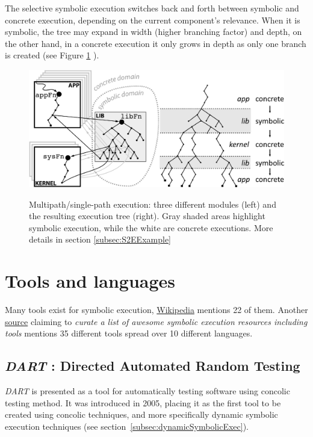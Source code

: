 \documentclass[11pt]{IEEEtran}
\begin{document}
    		The selective symbolic execution switches back and forth between symbolic and concrete execution, depending on the current component's relevance. When it is symbolic, the tree may expand in width (higher branching factor) and depth, on the other hand, in a concrete execution it only grows in depth as only one branch is created (see Figure \ref{fig:selectiveSymbolicExample} ).
    		\begin{figure}
    			\centering
    			\includegraphics[scale=0.9]{selectiveSymbolicExecExample.png}
    			\label{fig:selectiveSymbolicExample}
    			\caption{Multipath/single-path execution: three different modules (left) and the resulting execution tree (right). Gray shaded areas highlight symbolic execution, while the white are concrete executions. More details in section \ref{subsec:S2EExample}}
    		\end{figure}

  \section{Tools and languages}
  	Many tools exist for symbolic execution, \href{https://en.wikipedia.org/wiki/Symbolic_execution\#Tools}{Wikipedia} mentions 22 of them. Another \href{https://github.com/ksluckow/awesome-symbolic-execution\#tools}{source} claiming to \emph{curate a list of awesome symbolic execution resources including tools} mentions 35 different tools spread over 10 different languages.\\

    \subsection{\emph{DART} : Directed Automated Random Testing}
    \label{subsec:DART}
    	\emph{DART} is presented as a tool for automatically testing software using concolic testing method. It was introduced in 2005, placing it as the first tool to be created using concolic techniques, and more specifically dynamic symbolic execution techniques (see section~\ref{subsec:dynamicSymbolicExec}). \\
\end{document}
